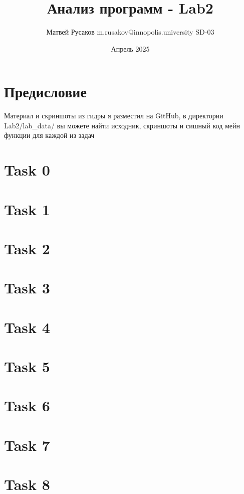 \usepackage{graphicx}
\usepackage{tabularx}
\usepackage{amsmath}
\usepackage[T2A]{fontenc}
\usepackage[top=5cm,bottom=3cm,right=3cm,left=3cm]{geometry}
\usepackage[utf8]{inputenc}

\title{Анализ программ - Lab2}
\author{Матвей Русаков m.rusakov@innopolis.university SD-03}
\date{Апрель 2025}



    \maketitle


    \section*{Предисловие}

    Материал и скриншоты из гидры я разместил на GitHub, в директории Lab2/lab\_data/ вы можете найти исходник,
    скриншоты и сишный код мейн функции для каждой из задач

    \section*{Task 0}
    

    \section*{Task 1}
    

    \section*{Task 2}
    

    \section*{Task 3}
    

    \section*{Task 4}
    

    \section*{Task 5}
    

    \section*{Task 6}
    

    \section*{Task 7}
    

    \section*{Task 8}
    


